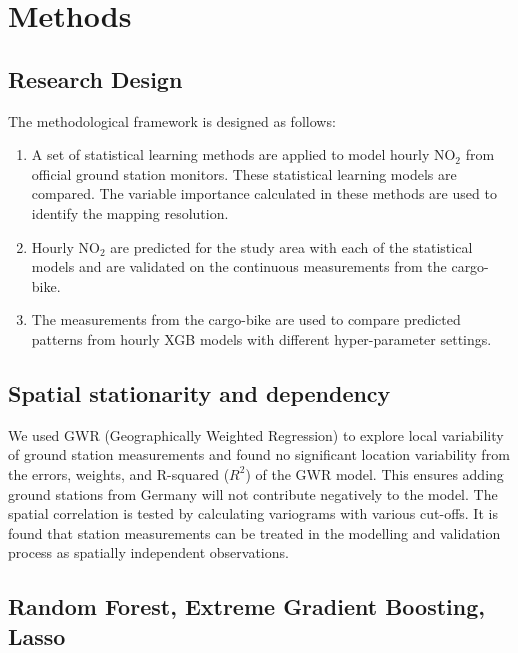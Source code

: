 \documentclass{article}
\begin{document}
\section{Methods}

\subsection{Research Design}
The methodological framework is designed as follows: 
\begin{enumerate}
    \item A set of statistical learning methods are applied to model hourly NO$_2$ from official ground station monitors. These statistical learning models are compared. The variable importance calculated in these methods are used to identify the mapping resolution. 
    
    \item Hourly NO$_2$ are predicted for the study area with each of the statistical models and are validated on the continuous measurements from the cargo-bike.
    
    \item The measurements from the cargo-bike are used to compare predicted patterns from hourly XGB models with different hyper-parameter settings. 
    
\end{enumerate} 


\subsection{Spatial stationarity and dependency}
We used GWR (Geographically Weighted Regression) to explore local variability of ground station measurements and found no significant location variability from the errors, weights, and R-squared ($R^2$) of the GWR model.  This ensures adding ground stations from Germany will not contribute negatively to the model. The spatial correlation is tested by calculating variograms with various cut-offs. It is found that station measurements can be treated in the modelling and validation process as spatially independent observations.


\subsection{Random Forest, Extreme Gradient Boosting, Lasso}
\end{document}

